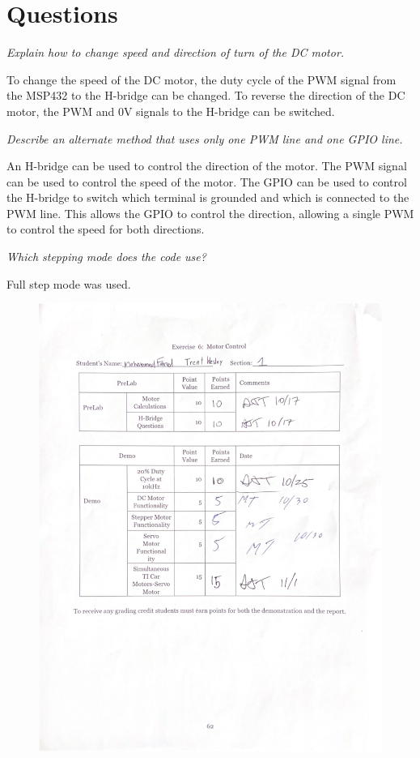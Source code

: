 \documentclass[CMPE]{KGCOEReport}
\begin{document}
\section*{Questions}

\emph{Explain how to change speed and direction of turn of the DC motor.}

To change the speed of the DC motor, the duty cycle of the PWM signal from the MSP432 to the H-bridge can be changed. To reverse the direction of the DC motor, the PWM and 0V signals to the H-bridge can be switched.

\bigskip

\emph{Describe an alternate method that uses only one PWM line and one GPIO line.}

An H-bridge can be used to control the direction of the motor. The PWM signal can be used to control the speed of the motor. The GPIO can be used to control the H-bridge to switch which terminal is grounded and which is connected to the PWM line. This allows the GPIO to control the direction, allowing a single PWM to control the speed for both directions.

\bigskip

\emph{Which stepping mode does the code use?}

Full step mode was used.\\

\newpage
\begin{figure}[H]
    \centering
    \begin{adjustbox}{center}
        \includegraphics[width=1.26\textwidth]{signoff.pdf}
    \end{adjustbox}
\end{figure}
\end{document}
